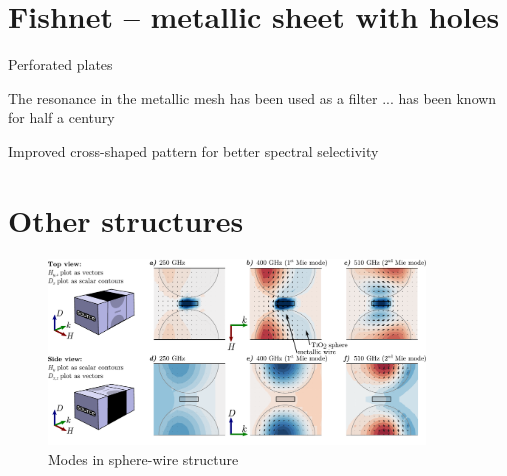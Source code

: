 \section{Fishnet -- metallic sheet with holes} \label{section_fishnet} %



Perforated plates \cite[p. 58]{brown1953artificial} %
\cite{yahiaoui2012metallo,rockstuhl2008light}

The resonance in the metallic mesh has been used as a filter 
\cite{ulrich1967effective,ulrich1967far}
... has been known for half a century \cite{vogel1964transmission}

Improved cross-shaped pattern for better spectral selectivity \cite{porterfield1994resonant}








\section{Other structures} %
\begin{figure} \caption{Modes in sphere-wire structure}  \centering \includegraphics[width=10cm]{img/new/modes_Mag_and_El.pdf} \end{figure} \clearpage
